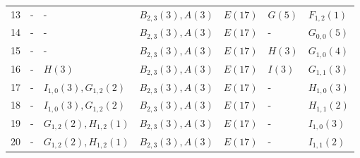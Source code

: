 \documentclass[a4paper, 11pt]{article}
\begin{document}
\begin{tabular}{r|l|l|l|l|l|l}
      13     & -               & -                             & $B_{2,3}(3),A(3)$  & $E(17)$        & $G(5)$       & $F_{1,2}(1)$       \\
      14     & -               & -                             & $B_{2,3}(3),A(3)$  & $E(17)$        & -            & $G_{0,0}(5)$       \\
      15     & -               & -                             & $B_{2,3}(3),A(3)$  & $E(17)$        & $H(3)$       & $G_{1,0}(4)$       \\
      16     & -               & $H(3)$                        & $B_{2,3}(3),A(3)$  & $E(17)$        & $I(3)$       & $G_{1,1}(3)$       \\
      17     & -               & $I_{1,0}(3), G_{1,2}(2)$      & $B_{2,3}(3),A(3)$  & $E(17)$        & -            & $H_{1,0}(3)$              \\
      18     & -               & $I_{1,0}(3), G_{1,2}(2)$      & $B_{2,3}(3),A(3)$  & $E(17)$        & -            & $H_{1,1}(2)$   \\
      19     & -               & $G_{1,2}(2),H_{1,2}(1)$       & $B_{2,3}(3),A(3)$  & $E(17)$        & -            & $I_{1,0}(3)$              \\
      20     & -               & $G_{1,2}(2),H_{1,2}(1)$       & $B_{2,3}(3),A(3)$  & $E(17)$        & -            & $I_{1,1}(2)$   \\
    \end{tabular} 
\end{document}
